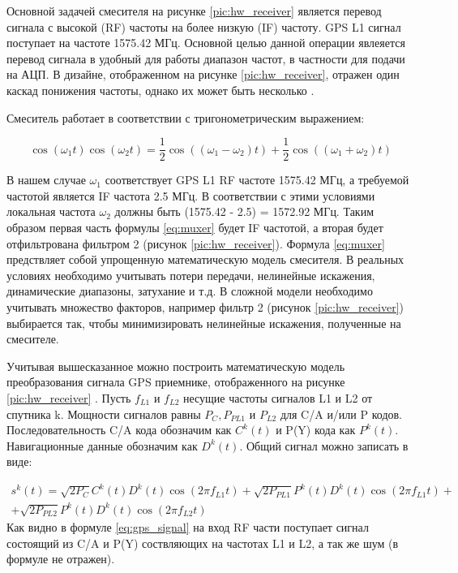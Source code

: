 Основной задачей смесителя на рисунке \ref{pic:hw_receiver} является перевод сигнала с высокой (RF) частоты на более низкую (IF)
частоту. GPS L1 сигнал поступает на частоте 1575.42 МГц. Основной целью данной операции явлеяется перевод сигнала
в удобный для работы диапазон частот, в частности для подачи на АЦП. В дизайне, отображенном на рисунке \ref{pic:hw_receiver},
отражен один каскад понижения частоты, однако их может быть несколько \cite{gps}. 

Смеситель работает в соответствии с тригонометрическим выражением:

\begin{equation}
\cos(\omega_1 t)\cos(\omega_2 t) = 
	\frac{1}{2}\cos((\omega_1 - \omega_2)t) + \frac{1}{2}\cos((\omega_1 + \omega_2)t)
\label{eq:muxer}
\end{equation}

В нашем случае ${\omega_1}$ соответствует GPS L1 RF частоте 1575.42 МГц, а требуемой частотой является IF частота 2.5 МГц. В соответствии 
с этими условиями локальная частота ${\omega_2}$ должны быть (1575.42 - 2.5) = 1572.92 МГц. Таким образом первая часть формулы
\ref{eq:muxer} будет IF частотой, а вторая будет отфильтрована фильтром 2 (рисунок \ref{pic:hw_receiver}). Формула \ref{eq:muxer} 
предствляет собой упрощенную математическую модель смесителя. В реальных условиях необходимо учитывать потери передачи, нелинейные
искажения, динамические диапазоны, затухание и т.д. В сложной модели необходимо учитывать множество факторов, например
фильтр 2 (рисунок \ref{pic:hw_receiver}) выбирается так, чтобы минимизировать нелинейные искажения, полученные на смесителе.

Учитывая вышесказанное можно построить математическую модель преобразования сигнала GPS приемнике,
отображенного на рисунке \ref{pic:hw_receiver} \cite{gps}.
Пусть ${f_{L1}}$ и ${f_{L2}}$ несущие частоты сигналов L1 и L2 от спутника k. Мощности сигналов равны  ${P_C, P_{PL1}}$ и
${P_{L2}}$ для C/A и/или P кодов. Последовательность C/A кода обозначим как ${C^k(t)}$ и P(Y) кода как ${P^k(t)}$.
Навигационные данные обозначим как ${D^k(t)}$. Общий сигнал можно записать в виде:

\begin{eqnarray}
s^k(t) =	\sqrt{2P_C} C^k(t) D^k(t) \cos(2 \pi f_{L1} t) +
		\sqrt{2P_{PL1}} P^k(t) D^k(t) \cos(2 \pi f_{L1} t) + \nonumber \\
		+ \sqrt{2P_{PL2}} P^k(t) D^k(t) \cos(2 \pi f_{L2} t)
\label{eq:gps_signal}
\end{eqnarray}
Как видно в формуле \ref{eq:gps_signal} на вход RF части поступает сигнал состоящий из C/A и P(Y) 
соствляющих на частотах L1 и L2, а так же шум (в формуле не отражен).

